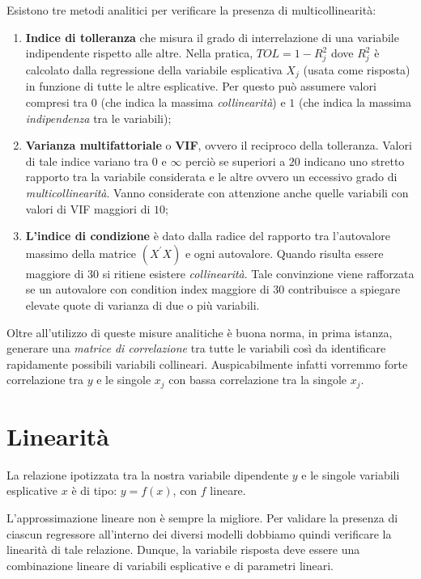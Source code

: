 \documentclass[a4page, 11pt]{article} %
\begin{document}
Esistono tre metodi analitici per verificare la presenza di multicollinearità:
\begin{enumerate}[noitemsep]
\item \textbf{Indice di tolleranza} che misura il grado di interrelazione di una variabile indipendente rispetto alle altre. Nella pratica, $TOL = 1 - R^{2}_j$ dove $R^{2}_j$ è calcolato dalla regressione della variabile esplicativa $X_j$ (usata come risposta) in funzione di tutte le altre esplicative. Per questo può assumere valori compresi tra $0$ (che indica la massima \textit{collinearità}) e $1$ (che indica la massima \textit{indipendenza} tra le variabili);

\item \textbf{Varianza multifattoriale} o \textbf{VIF}, ovvero il reciproco della tolleranza. 
Valori di tale indice variano tra $0$ e $\infty$ perciò se superiori a $20$ indicano uno stretto rapporto tra la variabile considerata e le altre ovvero un eccessivo grado di \textit{multicollinearità}. Vanno considerate con attenzione anche quelle variabili con valori di VIF maggiori di $10$;

\item \textbf{L'indice di condizione} è dato dalla radice del rapporto tra l’autovalore massimo della matrice $(X^{\prime}X)$ e ogni autovalore. Quando risulta essere maggiore di $30$ si ritiene esistere \textit{collinearità}. Tale convinzione viene rafforzata se un autovalore con condition index maggiore di $30$ contribuisce a spiegare elevate quote di varianza di due o più variabili.
\end{enumerate}
Oltre all'utilizzo di queste misure analitiche è buona norma, in prima istanza, generare una \textit{matrice di correlazione} tra tutte le variabili così da identificare rapidamente possibili variabili collineari. Auspicabilmente infatti vorremmo forte correlazione tra $y$ e le singole $x_j$ con bassa correlazione tra la singole $x_j$.
\section{Linearità}

La relazione ipotizzata tra la nostra variabile dipendente $y$ e le singole variabili esplicative $x$ è di tipo: $y = f (x)$, con $f$ lineare.

L'approssimazione lineare non è sempre la migliore.
Per validare la presenza di ciascun regressore all’interno dei diversi modelli dobbiamo quindi verificare la linearità di tale relazione.
Dunque, la variabile risposta deve essere una combinazione lineare di variabili esplicative e di parametri lineari.
\end{document}
